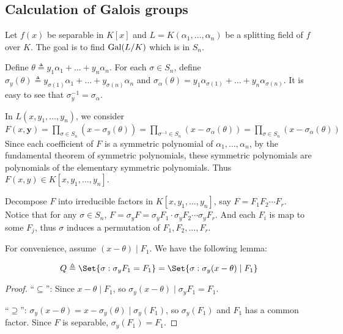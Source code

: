 \subsection{Calculation of Galois groups}
Let $f(x)$ be separable in $K[x]$ and $L = K(\alpha_1, \dots, \alpha_n)$ be a splitting field of
$f$ over $K$. The goal is to find $\operatorname{Gal}(L/K)$ which is in $S_n$.

Define $\theta \triangleq y_1 \alpha_1 + \dots + y_n \alpha_n$. For each $\sigma \in S_n$,
define $\sigma_y(\theta) \triangleq y_{\sigma(1)} \alpha_1 + \dots + y_{\sigma(n)} \alpha_n$ and
$\sigma_{\alpha}(\theta) = y_1 \alpha_{\sigma(1)} + \dots + y_n \alpha_{\sigma(n)}$.
It is easy to see that $\sigma_y^{-1} = \sigma_\alpha$. 

In $L(x, y_1, \dots, y_n)$, we consider $F(x, \bm{y}) = \prod_{\sigma \in S_n} (x - \sigma_y(\theta))
= \prod_{\sigma^{-1} \in S_n} (x - \sigma_{\alpha}(\theta)) = \prod_{\sigma \in S_n} (x - \sigma_\alpha(\theta))$
Since each coefficient of $F$ is a symmetric polynomial of $\alpha_1, \dots, \alpha_n$,
by the fundamental theorem of symmetric polynomials, these symmetric polynomials are
polynomials of the elementary symmetric polynomials. Thus $F(x, y) \in K[x, y_1, \dots, y_n]$.

Decompose $F$ into irreducible factors in $K[x, y_1, \dots, y_n]$, say $F = F_1 F_2 \dotsm F_r$.
Notice that for any $\sigma \in S_n$, $F = \sigma_y F = \sigma_y F_1 \cdot \sigma_y F_2 \dotsm \sigma_y F_r$.
And each $F_i$ is map to some $F_j$, thus $\sigma$ induces a permutation of $F_1, F_2, \dots, F_r$.

For convenience, assume $(x - \theta) \mid F_1$. We have the following lemma:

\begin{lemma}
  \[ Q \triangleq \Set{ \sigma : \sigma_y F_1 = F_1 } = \Set{ \sigma : \sigma_y(x - \theta) \mid F_1} \]
  \begin{proof}
    ``$\subseteq$'': Since $x - \theta \mid F_1$, so $\sigma_y (x - \theta) \mid \sigma_y F_1 = F_1$.

    ``$\supseteq$'': $\sigma_y(x - \theta) = x - \sigma_y(\theta) \mid \sigma_y(F_1)$, so $\sigma_y(F_1)$
    and $F_1$ has a common factor. Since $F$ is separable, $\sigma_y(F_1) = F_1$.
  \end{proof}
\end{lemma}


